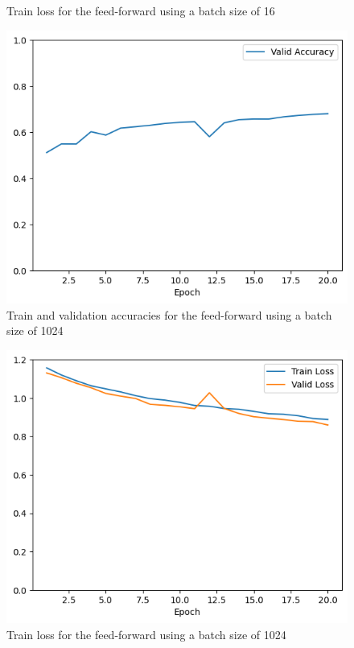 \documentclass[12pt]{article}
\begin{document}
\begin{itemize}
\begin{figure}[H]
              \caption{Train loss for the feed-forward using a batch size of 16}
              \label{fig:2.2a:loss:16}
          \end{figure}
          \begin{figure}[H]
              \centering
              \includegraphics[width=0.5\linewidth]{../outputs/hw1-q2-2a-acc-1024.png}
              \caption{Train and validation accuracies for the feed-forward using a batch size of 1024}
              \label{fig:2.2a:acc:1024}
          \end{figure}
          \begin{figure}[H]
              \centering
              \includegraphics[width=0.5\linewidth]{../outputs/hw1-q2-2a-loss-1024.png}
              \caption{Train loss for the feed-forward using a batch size of 1024}
              \label{fig:2.2a:loss:1024}
          \end{figure}
\end{itemize}
\end{document}
